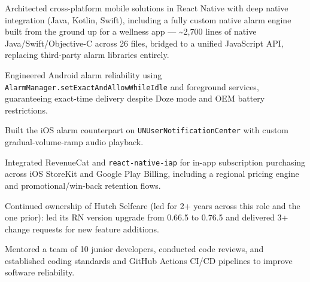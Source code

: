 \documentclass[10.5pt]{article}
\begin{document}
\begin{cvitems}
  \item Architected cross-platform mobile solutions in React Native with deep native integration (Java, Kotlin, Swift), including a fully custom native alarm engine built from the ground up for a wellness app --- \textasciitilde2,700 lines of native Java/Swift/Objective-C across 26 files, bridged to a unified JavaScript API, replacing third-party alarm libraries entirely.
  \item Engineered Android alarm reliability using \texttt{AlarmManager.setExactAndAllowWhileIdle} and foreground services, guaranteeing exact-time delivery despite Doze mode and OEM battery restrictions.
  \item Built the iOS alarm counterpart on \texttt{UNUserNotificationCenter} with custom gradual-volume-ramp audio playback.
  \item Integrated RevenueCat and \texttt{react-native-iap} for in-app subscription purchasing across iOS StoreKit and Google Play Billing, including a regional pricing engine and promotional/win-back retention flows.
  \item Continued ownership of Hutch Selfcare (led for 2+ years across this role and the one prior): led its RN version upgrade from 0.66.5 to 0.76.5 and delivered 3+ change requests for new feature additions.
  \item Mentored a team of 10 junior developers, conducted code reviews, and established coding standards and GitHub Actions CI/CD pipelines to improve software reliability.
\end{cvitems}
\end{document}
